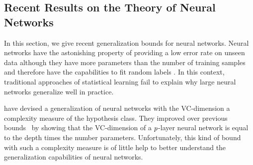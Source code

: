 

\subsection{Recent Results on the Theory of Neural Networks}
\label{subsection:ch2-recent_results_on_the_theory_of_neural_networks}

In this section, we give recent generalization bounds for neural networks.
Neural networks have the astonishing property of providing a low error rate on unseen data although they have more parameters than the number of training samples and therefore have the capabilities to fit random labels \cite{zhang2016understanding}.
In this context, traditional approaches of statistical learning  fail to explain why large neural networks generalize well in practice.

\citet{harvey2017nearly} have devised a generalization of neural networks with the VC-dimension a complexity measure of the hypothesis class.
They improved over previous bounds~\cite{bartlett1998almost,anthony1999neural} by showing that the VC-dimension of a $p$-layer neural network is equal to the depth times the number parameters.
Unfortunately, this kind of bound with such a complexity measure is of little help to better understand the generalization capabilities of neural networks.

